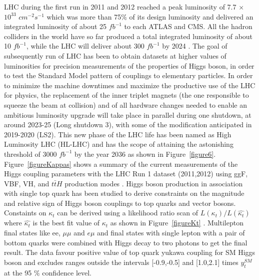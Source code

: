 \documentclass[final,3p]{CSP}
\begin{document}
LHC during the first run in 2011 and 2012 reached a peak luminosity of 7.7 $\times$ $10^{33}$ $cm^{-2}s^{-1}$ which was more than 75$\%$ of its design luminosity and delivered an integrated luminosity of about 25 $fb^{-1}$ to each ATLAS and CMS.
All the hadron colliders in the world have so far produced a total integrated luminosity of about 10 $fb^{-1}$, while the LHC will deliver about 300 $fb^{-1}$ by 2024 \cite{collaborations2019report}.
The goal of subsequently run of LHC has been to obtain datasets at higher values of luminosities for precision measurements of the properties of Higgs boson, in order to test the Standard Model pattern of couplings to elementary particles.
In order to minimize the machine downtimes and maximize the productive use of the LHC for physics, the replacement of the inner triplet magnets (the one responsible to squeeze the beam at collision) and  of  all  hardware  changes  needed  to  enable  an  ambitious  luminosity  upgrade  will  take  place in parallel during one shutdown, at around 2023-25 (Long shutdown 3), with some of the modification anticipated in 2019-2020 (LS2).
This new phase of the LHC life has been named as High Luminosity LHC (HL-LHC) and has the scope of attaining the astonishing threshold of 3000 $fb^{-1}$ by the year 2036 as shown in Figure~\ref{figure6}.
Figure~\ref{figureKappas} shows a summary of the current measurements of the Higgs coupling parameters with the LHC Run 1 dataset (2011,2012)  using ggF, VBF, VH, and ${t\bar{t}H}$ production modes \cite{Tanabashi:2018oca}.
Higgs boson production in association with single top quark has been studied to derive constraints on the magnitude and relative sign of Higgs boson couplings to top quarks and vector bosons.
Constaints on $\kappa_t$ can be derived using a likelihood ratio scan of $L(\kappa_t)/L(\hat{\kappa_t})$ where $\hat{\kappa_t}$ is the best fit value of $\kappa_t$ as shown in Figure~\ref{figureKt} \cite{Sirunyan:2018lzm}.
Multilepton final states like ee, $\mu\mu$ and $e\mu$ and final states with single lepton with a pair of bottom quarks were combined with Higgs decay to two photons to get the final result. The data favour positive value of top quark yukawa coupling for SM Higgs boson and excludes ranges outside the intervals [-0.9,-0.5] and [1.0,2.1] times $y^{SM}_t$ at the 95 $\%$ confidence level.
\newpage
\end{document}
